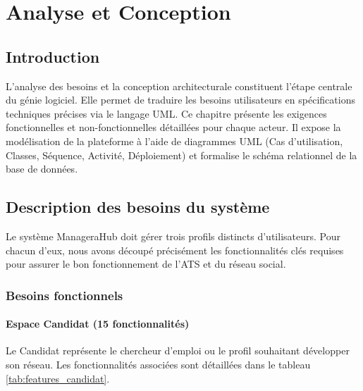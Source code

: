 \chapter{Analyse et Conception}

\section{Introduction}
L'analyse des besoins et la conception architecturale constituent l'étape centrale du génie logiciel. Elle permet de traduire les besoins utilisateurs en spécifications techniques précises via le langage UML. Ce chapitre présente les exigences fonctionnelles et non-fonctionnelles détaillées pour chaque acteur. Il expose la modélisation de la plateforme à l'aide de diagrammes UML (Cas d'utilisation, Classes, Séquence, Activité, Déploiement) et formalise le schéma relationnel de la base de données.

\section{Description des besoins du système}
Le système ManageraHub doit gérer trois profils distincts d'utilisateurs. Pour chacun d'eux, nous avons découpé précisément les fonctionnalités clés requises pour assurer le bon fonctionnement de l'ATS et du réseau social.

\subsection{Besoins fonctionnels}

\subsubsection{Espace Candidat (15 fonctionnalités)}
Le Candidat représente le chercheur d'emploi ou le profil souhaitant développer son réseau. Les fonctionnalités associées sont détaillées dans le tableau \ref{tab:features_candidat}.

